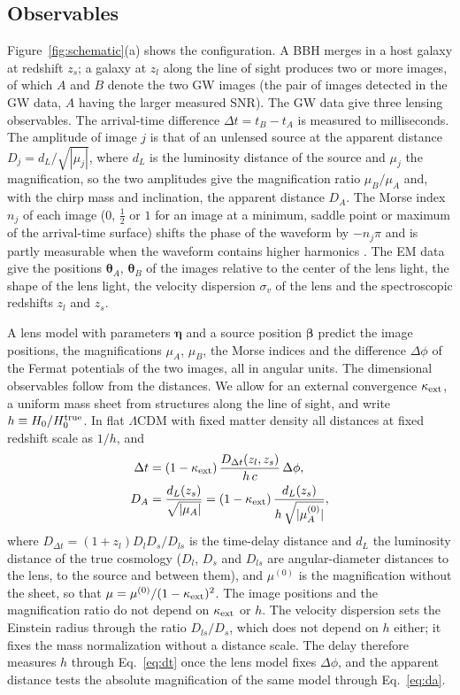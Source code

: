 \subsection{Observables}
\label{sec:observables}
Figure~\ref{fig:schematic}(a) shows the configuration. A BBH merges in a host galaxy at redshift $z_s$; a galaxy at $z_l$ along the line of sight produces two or more images, of which $A$ and $B$ denote the two GW images (the pair of images detected in the GW data, $A$ having the larger measured SNR). The GW data give three lensing observables. The arrival-time difference $\Delta t=t_B-t_A$ is measured to milliseconds. The amplitude of image $j$ is that of an unlensed source at the apparent distance $D_j=d_L/\sqrt{|\mu_j|}$, where $d_L$ is the luminosity distance of the source and $\mu_j$ the magnification, so the two amplitudes give the magnification ratio $\mu_B/\mu_A$ and, with the chirp mass and inclination, the apparent distance $D_A$. The Morse index $n_j$ of each image ($0$, $\frac12$ or $1$ for an image at a minimum, saddle point or maximum of the arrival-time surface) shifts the phase of the waveform by $-n_j\pi$ and is partly measurable when the waveform contains higher harmonics \citep{dai2017morse,janquart2023golum,lo2023bayesian}. The EM data give the positions $\boldsymbol\theta_A$, $\boldsymbol\theta_B$ of the images relative to the center of the lens light, the shape of the lens light, the velocity dispersion $\sigma_v$ of the lens and the spectroscopic redshifts $z_l$ and $z_s$.

A lens model with parameters $\boldsymbol\eta$ and a source position $\boldsymbol\beta$ predict the image positions, the magnifications $\mu_A$, $\mu_B$, the Morse indices and the difference $\Delta\phi$ of the Fermat potentials of the two images, all in angular units. The dimensional observables follow from the distances. We allow for an external convergence $\kappa_{\rm ext}$, a uniform mass sheet from structures along the line of sight, and write $h\equiv H_0/H_0^{\rm true}$. In flat $\Lambda$CDM with fixed matter density all distances at fixed redshift scale as $1/h$, and
\begin{align}
\Delta t&=(1-\kappa_{\rm ext})\,\frac{D_{\Delta t}(z_l,z_s)}{h\,c}\,\Delta\phi,\label{eq:dt}\\
D_A&=\frac{d_L(z_s)}{\sqrt{|\mu_A|}}=(1-\kappa_{\rm ext})\,\frac{d_L(z_s)}{h\,\sqrt{|\mu_A^{(0)}|}},\label{eq:da}
\end{align}
where $D_{\Delta t}=(1+z_l)D_lD_s/D_{ls}$ is the time-delay distance and $d_L$ the luminosity distance of the true cosmology ($D_l$, $D_s$ and $D_{ls}$ are angular-diameter distances to the lens, to the source and between them), and $\mu^{(0)}$ is the magnification without the sheet, so that $\mu=\mu^{(0)}/(1-\kappa_{\rm ext})^2$. The image positions and the magnification ratio do not depend on $\kappa_{\rm ext}$ or $h$. The velocity dispersion sets the Einstein radius through the ratio $D_{ls}/D_s$, which does not depend on $h$ either; it fixes the mass normalization without a distance scale. The delay therefore measures $h$ through Eq.~\eqref{eq:dt} once the lens model fixes $\Delta\phi$, and the apparent distance tests the absolute magnification of the same model through Eq.~\eqref{eq:da}.

